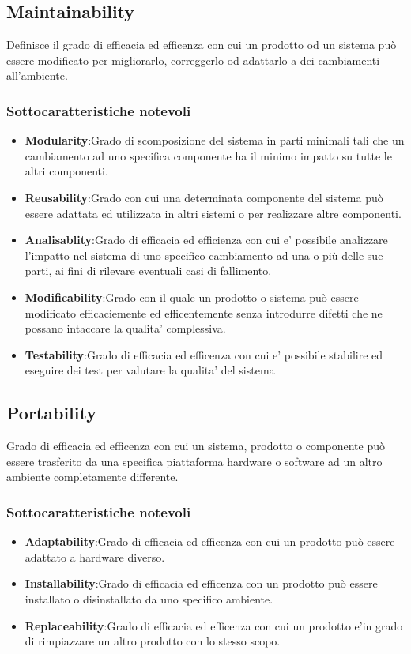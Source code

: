 \subsection{Maintainability}
Definisce il grado di efficacia ed efficenza con cui un prodotto od un sistema può essere modificato per migliorarlo, correggerlo od adattarlo a dei cambiamenti all'ambiente. 
\subsubsection{Sottocaratteristiche notevoli}
\begin{itemize}
	\item{\textbf{Modularity}}:Grado di scomposizione del sistema in parti minimali tali che un cambiamento ad uno specifica componente ha il minimo impatto su tutte le altri componenti.
	\item{\textbf{Reusability}}:Grado con cui una determinata componente del sistema può essere adattata ed utilizzata in altri sistemi o per realizzare altre componenti.
	\item{\textbf{Analisablity}}:Grado di efficacia ed efficienza con cui e' possibile analizzare l'impatto nel sistema di uno specifico cambiamento ad una o più delle sue parti, ai fini di rilevare eventuali casi di fallimento.
	\item{\textbf{Modificability}}:Grado con il quale un prodotto o sistema può essere modificato efficaciemente ed efficentemente senza introdurre difetti che ne possano intaccare la qualita' complessiva.
	\item{\textbf{Testability}}:Grado di efficacia ed efficenza con cui e' possibile stabilire ed eseguire dei test per valutare la qualita' del sistema
\end{itemize}
\subsection{Portability}
Grado di efficacia ed efficenza con cui un sistema, prodotto o componente può essere trasferito da una specifica piattaforma hardware o software ad un altro ambiente completamente differente.
\subsubsection{Sottocaratteristiche notevoli}
\begin{itemize}
	\item{\textbf{Adaptability}}:Grado di efficacia ed efficenza con cui un prodotto può essere adattato a hardware diverso.
	\item{\textbf{Installability}}:Grado di efficacia ed efficenza con un prodotto può essere installato o disinstallato da uno specifico ambiente.
	\item{\textbf{Replaceability}}:Grado di efficacia ed efficenza con cui un prodotto e'in grado di rimpiazzare un altro prodotto con lo stesso scopo.
\end{itemize}
\pagebreak